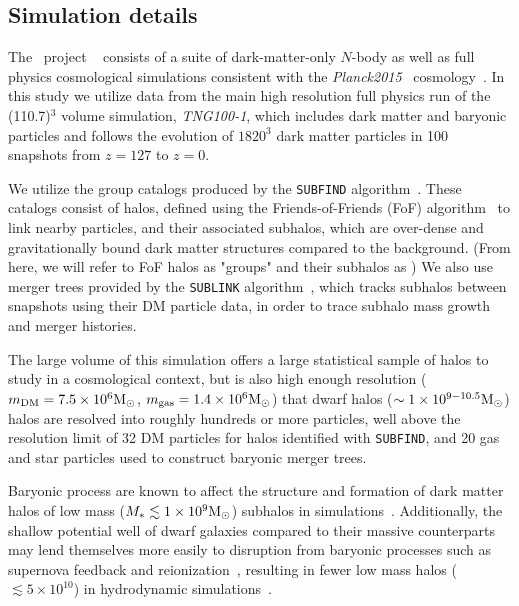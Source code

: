 \documentclass[twocolumn]{aastex631}
\begin{document}
    \subsection{Simulation details} \label{sec:methods-sims}
    The \tng\ project ~\citep{TNG1, TNG2, TNG3, TNG4, TNG5} consists of a suite of dark-matter-only $N$-body as well as full physics cosmological simulations consistent with the \textit{Planck2015} \lcdm\  cosmology~\citep{Planck2015}.
    In this study we utilize data from the main high resolution full physics run of the (110.7\Mpc)$^3$ volume simulation, \textsl{TNG100-1}, which includes dark matter and baryonic particles and follows the evolution of $1820^3$ dark matter particles in 100 snapshots from $z=127$ to $z=0$. 

    We utilize the group catalogs produced by the \texttt{SUBFIND} algorithm~\citep{springel2001,dolag09}. 
    These catalogs consist of halos, defined using the Friends-of-Friends (FoF) algorithm~\citep{davis1985} to link nearby particles, and their associated subhalos, which are over-dense and gravitationally bound dark matter structures compared to the background. (From here, we will refer to FoF halos as "groups" and their subhalos as )
    We also use merger trees provided by the \texttt{SUBLINK} algorithm~\citep{rg15}, which tracks subhalos between snapshots using their DM particle data, in order to trace subhalo mass growth and merger histories.
    
    The large volume of this simulation offers a large statistical sample of halos to study in a cosmological context, but is also high enough resolution ($m_{\rm DM} = 7.5\times10^6\mathrm{M}_\odot$, $m_{\rm gas} = 1.4\times10^6\mathrm{M}_\odot$) that dwarf halos ($\sim1\times10^{9-10.5}\mathrm{M}_\odot$) halos are resolved into roughly hundreds or more particles, well above the resolution limit of 32 DM particles for halos identified with \texttt{SUBFIND}, and 20 gas and star particles used to construct baryonic merger trees.  

    Baryonic process are known to affect the structure and formation of dark matter halos of low mass ($M_*\lesssim 1\times10^9\mathrm{M}_\odot$) subhalos in simulations~\citep[see e.g.][and references therein]{Sales:2022}.
    Additionally, the shallow potential well of dwarf galaxies compared to their massive counterparts may lend themselves more easily to disruption from baryonic processes such as supernova feedback and reionization~\citep{}, resulting in fewer low mass halos ($\lesssim 5\times10^{10}$) in hydrodynamic simulations~\citep{vogelsberger14B}.
\end{document}
